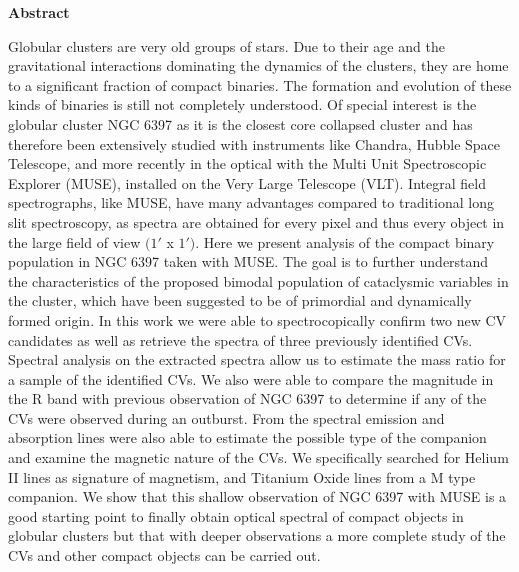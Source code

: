 \thispagestyle{empty}
\begin{Large}
\textbf{Abstract}
\end{Large}
\bigbreak
Globular clusters are very old groups of stars. Due to their age and the gravitational interactions dominating the dynamics of the clusters, they are home to a significant fraction of compact binaries. The formation
and evolution of these kinds of binaries is still not completely understood. Of special interest is the globular cluster NGC 6397 as it is the closest core collapsed cluster and has therefore been extensively studied
with instruments like Chandra, Hubble Space Telescope, and more recently in the optical with the Multi Unit Spectroscopic Explorer (MUSE), installed on the Very Large Telescope (VLT). Integral field spectrographs, like MUSE, have many advantages compared to traditional long slit spectroscopy, as spectra are obtained for every pixel and thus every object in the large field of view $(1'$ x $1')$. Here we present analysis of the compact binary population in NGC 6397 taken with MUSE. The goal is to further understand the characteristics of the proposed bimodal population of cataclysmic variables in the cluster, which have been suggested to be of primordial and dynamically formed origin. In this work we were able to spectrocopically confirm two new CV candidates as well  as retrieve the spectra of three previously identified CVs. Spectral analysis on the extracted spectra allow us to estimate the mass ratio for a sample of the identified CVs. We also were able to compare the magnitude in the R band with previous observation of NGC 6397 to determine if any of the CVs were observed during an outburst.  From the spectral emission and absorption lines were also able to estimate the possible type of the companion and examine the magnetic nature of the CVs. We specifically searched for Helium II lines as signature of magnetism, and Titanium Oxide lines from a M type companion. We show that this shallow observation of NGC 6397 with MUSE is a good starting point to finally obtain optical spectral of compact objects in globular clusters but that with deeper observations a more complete study of the CVs and other compact objects can be carried out. 
\clearpage
